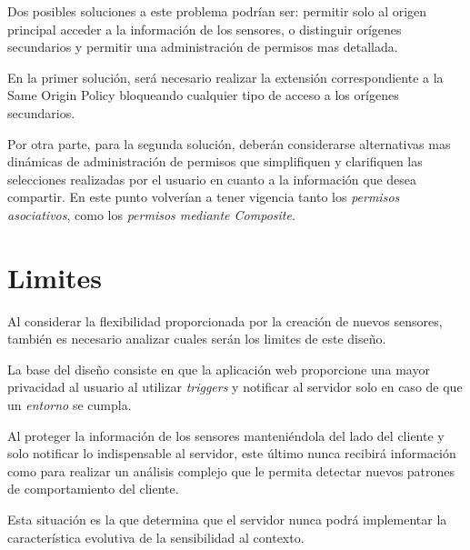 Dos posibles soluciones a este problema podrían ser: permitir solo al origen principal acceder a la información de los sensores, o distinguir orígenes secundarios y permitir una administración de permisos mas detallada.

En la primer solución, será necesario realizar la extensión correspondiente a la Same Origin Policy bloqueando cualquier tipo de acceso a los orígenes secundarios.

Por otra parte, para la segunda solución, deberán considerarse alternativas mas dinámicas de administración de permisos que simplifiquen y clarifiquen las selecciones realizadas por el usuario en cuanto a la información que desea compartir. En este punto volverían a tener vigencia tanto los \emph{permisos asociativos}, como los \emph{permisos mediante Composite}.


\section{Limites}

Al considerar la flexibilidad proporcionada por la creación de nuevos sensores, también es necesario analizar cuales serán los limites de este diseño.

La base del diseño consiste en que la aplicación web proporcione una mayor privacidad al usuario al utilizar \emph{triggers} y notificar al servidor solo en caso de que un \emph{entorno} se cumpla.

Al proteger la información de los sensores manteniéndola del lado del cliente y solo notificar lo indispensable al servidor, este último nunca recibirá información como para realizar un análisis complejo que le permita detectar nuevos patrones de comportamiento del cliente.

Esta situación es la que determina que el servidor nunca podrá implementar la característica evolutiva de la sensibilidad al contexto.
